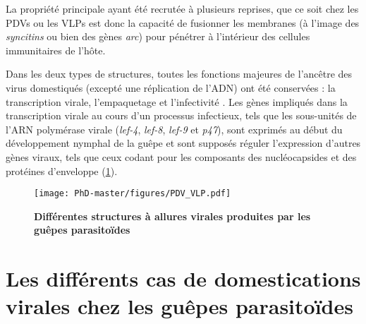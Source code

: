 La propriété principale ayant été recrutée à plusieurs reprises, que ce soit chez les PDVs ou les VLPs est donc la capacité de fusionner les membranes (à l'image des \textit{syncitins} ou bien des gènes \textit{arc}) pour pénétrer à l'intérieur des cellules immunitaires de l'hôte. 

Dans les deux types de structures, toutes les fonctions majeures de l'ancêtre des virus domestiqués (excepté une réplication de l'ADN) ont été conservées : la transcription virale, l'empaquetage et l'infectivité \citep{drezen_endogenous_2017}. Les gènes impliqués dans la transcription virale au cours d'un processus infectieux, tels que les sous-unités de l'ARN polymérase virale (\textit{lef-4}, \textit{lef-8}, \textit{lef-9} et \textit{p47}), sont exprimés au début du développement nymphal de la guêpe et sont supposés réguler l'expression d'autres gènes viraux, tels que ceux codant pour les composants des nucléocapsides et des protéines d'enveloppe (\figurename{\ref{figure:PDV_VLP}}). 

\begin{figure}[H]
\captionsetup{font=footnotesize}
 \centering
  \texttt{[image: PhD-master/figures/PDV\_VLP.pdf]}
\caption[Intro:Différentes structures à allures virales produites par les guêpes parasitoïdes]{\textbf{Différentes structures à allures virales produites par les guêpes parasitoïdes} }
\label{figure:PDV_VLP}
\end{figure}


\section{Les différents cas de domestications virales  chez les guêpes parasitoïdes}

